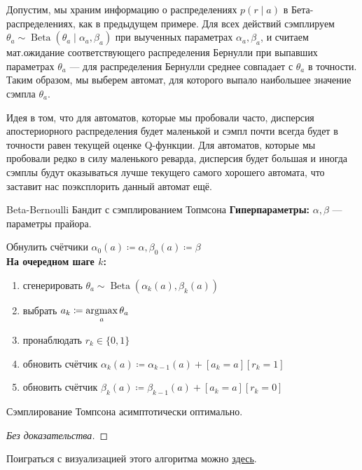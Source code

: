 \begin{example}
Допустим, мы храним информацию о распределениях $p(r \mid a)$ в Бета-распределениях, как в предыдущем примере. Для всех действий сэмплируем $\theta_a \sim \operatorname{Beta}(\theta_a \mid \alpha_a, \beta_a)$ при выученных параметрах $\alpha_a, \beta_a$, и считаем мат.ожидание соответствующего распределения Бернулли при выпавших параметрах $\theta_a$ --- для распределения Бернулли среднее совпадает с $\theta_a$ в точности. Таким образом, мы выберем автомат, для которого выпало наибольшее значение сэмпла $\theta_a$.
\end{example}

Идея в том, что для автоматов, которые мы пробовали часто, дисперсия апостериорного распределения будет маленькой и сэмпл почти всегда будет в точности равен текущей оценке Q-функции. Для автоматов, которые мы пробовали редко в силу маленького реварда, дисперсия будет большая и иногда сэмплы будут оказываться лучше текущего самого хорошего автомата, что заставит нас поэксплорить данный автомат ещё.

\begin{algorithm}{Beta-Bernoulli Бандит с сэмплированием Топмсона}
\textbf{Гиперпараметры:} $\alpha, \beta$ --- параметры прайора.

\vspace{0.3cm}
Обнулить счётчики $\alpha_0(a) \coloneqq \alpha, \beta_0(a) \coloneqq \beta$ \\
\textbf{На очередном шаге $k$:}
\begin{enumerate}
    \item сгенерировать $\theta_a \sim \operatorname{Beta}(\alpha_k(a), \beta_k(a))$
    \item выбрать $a_k \coloneqq \mathop{\mathrm{argmax}}\limits_{a} \theta_a$
    \item пронаблюдать $r_k \in \{0, 1\}$
    \item обновить счётчик $\alpha_k(a) \coloneqq \alpha_{k-1}(a) + [a_k = a][r_k = 1]$
    \item обновить счётчик $\beta_k(a) \coloneqq \beta_{k-1}(a) + [a_k = a][r_k = 0]$
\end{enumerate}
\end{algorithm}

\begin{theorem}
Сэмплирование Томпсона асимптотически оптимально.
\begin{proof}[Без доказательства]\end{proof}
\end{theorem}

\begin{example}
Поиграться с визуализацией этого алгоритма можно \href{https://learnforeverlearn.com/bandits/}{здесь}.
\end{example}


